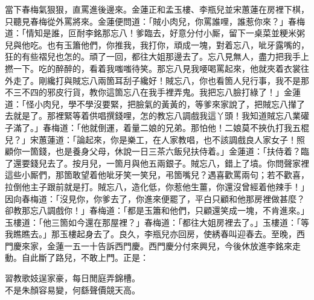 當下春梅氣狠狠，直罵進後邊來。金蓮正和孟玉樓、李瓶兒並宋蕙蓮在房裡下棋，只聽見春梅從外罵將來。金蓮便問道：「賊小肉兒，你罵誰哩，誰惹你來？」春梅道：「情知是誰，叵耐李銘那忘八！爹臨去，好意分付小厮，留下一桌菜並粳米粥兒與他吃。也有玉簫他們，你推我，我打你，頑成一塊，對着忘八，呲牙露嘴的，狂的有些褶兒也怎的。頑了一回，都往大姐那邊去了。忘八見無人，盡力把我手上撚一下。吃的醉醉的，看着我嗤嗤待笑。{}那忘八見我喓喝罵起來，他就夾着衣裳往外走了。剛纔打與賊忘八兩箇耳刮子纔好！賊忘八，你也看箇人兒行事，我不是那不三不四的邪皮行貨，教你這箇忘八在我手裡弄鬼。我把忘八臉打綠了！」金蓮道：「怪小肉兒，學不學沒要緊，把臉氣的黃黃的，等爹來家說了，把賊忘八攆了去就是了。那裡緊等着供唱撰錢哩，{}怎的教忘八調戲我這丫頭！我知道賊忘八業礶子滿了。」春梅道：「他就倒運，着量二娘的兄弟。{}那怕他！二娘莫不挾仇打我五棍兒？」宋蕙蓮道：「論起來，你是樂工，在人家教唱，也不該調戲良人家女子！照顧你一箇錢，也是養身父母，休說一日三茶六飯兒扶侍着。」金蓮道：「扶侍着？臨了還要錢兒去了。按月兒，一箇月與他五兩銀子。賊忘八，錯上了墳。你問聲家裡這些小厮們，那箇敢望着他呲牙笑一笑兒，弔箇嘴兒？遇喜歡罵兩句；若不歡喜，拉倒他主子跟前就是打。賊忘八，造化低，你惹他生薑，你還沒曾經着他辣手！」{}因向春梅道：「沒見你，你爹去了，你進來便罷了，平白只顧和他那房裡做甚麼？卻教那忘八調戲你！」春梅道：「都是玉簫和他們，只顧還笑成一塊，不肯進來。」玉樓道：「他三箇如今還在那屋裡？」春梅道：「都往大姐房裡去了。」玉樓道：「等我瞧瞧去。」那玉樓起身去了。良久，李瓶兒亦回房，使綉春叫迎春去。至晚，西門慶來家，金蓮一五一十告訴西門慶。西門慶分付來興兒，今後休放進李銘來走動。自此斷了路兒，不敢上門。正是：

\begin{myquote} 
習教歌妓逞家豪，每日閒庭弄錦槽。\\不是朱顏容易變，何繇聲價競天高。
\end{myquote} 

